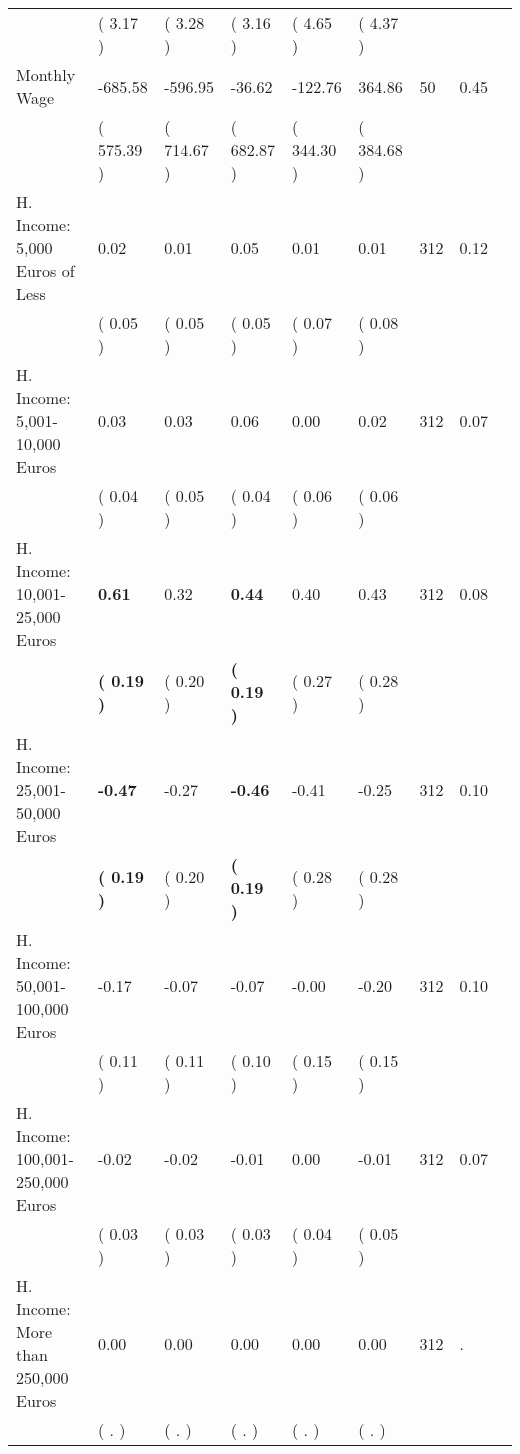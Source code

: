 \begin{tabular}{L{6.2cm} C{1.8cm} C{1.8cm} C{1.8cm} C{1.8cm} C{1.8cm} C{1.8cm} C{0.3cm} C{0.3cm}}
 & (     3.17 ) & (     3.28 ) & (     3.16 ) & (     4.65 ) & (     4.37 )  & \\
Monthly Wage &   -685.58 &   -596.95 &    -36.62 &   -122.76 &    364.86  & 50 &       0.45 \\ 
 & (   575.39 ) & (   714.67 ) & (   682.87 ) & (   344.30 ) & (   384.68 )  & \\
H. Income: 5,000 Euros of Less &      0.02 &      0.01 &      0.05 &      0.01 &      0.01  & 312 &       0.12 \\ 
 & (     0.05 ) & (     0.05 ) & (     0.05 ) & (     0.07 ) & (     0.08 )  & \\
H. Income: 5,001-10,000 Euros &      0.03 &      0.03 &      0.06 &      0.00 &      0.02  & 312 &       0.07 \\ 
 & (     0.04 ) & (     0.05 ) & (     0.04 ) & (     0.06 ) & (     0.06 )  & \\
H. Income: 10,001-25,000 Euros & \textbf{     0.61} &      0.32 & \textbf{     0.44} &      0.40 &      0.43  & 312 &       0.08 \\ 
 & \textbf{(     0.19 )} & (     0.20 ) & \textbf{(     0.19 )} & (     0.27 ) & (     0.28 )  & \\
H. Income: 25,001-50,000 Euros & \textbf{    -0.47} &     -0.27 & \textbf{    -0.46} &     -0.41 &     -0.25  & 312 &       0.10 \\ 
 & \textbf{(     0.19 )} & (     0.20 ) & \textbf{(     0.19 )} & (     0.28 ) & (     0.28 )  & \\
H. Income: 50,001-100,000 Euros &     -0.17 &     -0.07 &     -0.07 &     -0.00 &     -0.20  & 312 &       0.10 \\ 
 & (     0.11 ) & (     0.11 ) & (     0.10 ) & (     0.15 ) & (     0.15 )  & \\
H. Income: 100,001-250,000 Euros &     -0.02 &     -0.02 &     -0.01 &      0.00 &     -0.01  & 312 &       0.07 \\ 
 & (     0.03 ) & (     0.03 ) & (     0.03 ) & (     0.04 ) & (     0.05 )  & \\
H. Income: More than 250,000 Euros &      0.00 &      0.00 &      0.00 &      0.00 &      0.00  & 312 &          . \\ 
 & (        . ) & (        . ) & (        . ) & (        . ) & (        . )  & \\
\bottomrule
\end{tabular}
